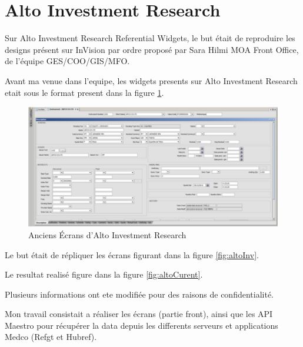 \section{Alto Investment Research}
\par Sur Alto Investment Research Referential Widgets, le but était de reproduire les designs présent sur InVision par ordre proposé par Sara Hilmi MOA Front Office, de l'équipe GES/COO/GIS/MFO.
\par Avant ma venue dans l'equipe, les widgets presents sur Alto Investment Research etait sous le format present dans la figure \ref{fig:altoV1}.
\begin{figure}[ht]
    \centering
    \includegraphics[width=\columnwidth]{img/ancienecrans.png}
    \caption{Anciens Écrans d'Alto Investment Research}
    \label{fig:altoV1}
\end{figure} 
\par Le but était de répliquer les écrans figurant dans la figure \ref{fig:altoInv}.
\par Le resultat realisé figure dans la figure \ref{fig:altoCurent}.
\par Plusieurs informations ont ete modifiée pour des raisons de confidentialité.
\par Mon travail consistait a réaliser les écrans (partie front), ainsi que les API Maestro pour récupérer la data depuis les differents serveurs et applications Medco (Refgt et Hubref).
